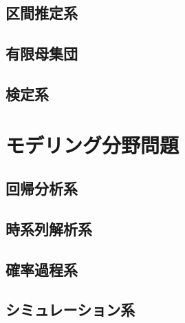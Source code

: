 \documentclass{jsbook}
\begin{document}
\section{区間推定系}
\newpage
\section{有限母集団}
\newpage
\section{検定系}

\chapter{モデリング分野問題}
\section{回帰分析系}
\newpage
\section{時系列解析系}
\newpage
\section{確率過程系}
\newpage
\section{シミュレーション系}
\begin{equation}
\end{equation}

\begin{equation}
\end{equation}

\begin{equation}
\end{equation}
\end{document}
